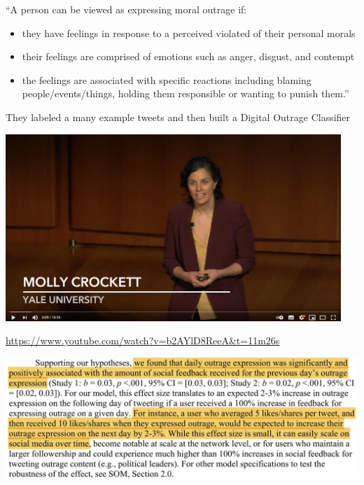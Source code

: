 \documentclass[aspectratio=169]{beamer}
\begin{document}
\begin{frame}

``A person can be viewed as expressing moral outrage if:
\begin{itemize}
\item they have feelings in response to a perceived violated of their personal morals 
\item their feelings are comprised of emotions such as anger, disgust, and contempt
\item the feelings are associated with specific reactions including blaming people/events/things, holding them responsible or wanting to punish them.''
\end{itemize}

\vfill
They labeled a many example tweets and then built a Digital Outrage Classifier

\end{frame}
\begin{frame} 

\begin{center}
\includegraphics[width=0.95\textwidth]{figures/crockett_talk}
\end{center}

\vfill

\url{https://www.youtube.com/watch?v=b2AYlD8ReeA&t=11m26s}

\end{frame}
\begin{frame} 

\begin{center}
\includegraphics[width=\textwidth]{figures/brady_how_2021_study1_2}
\end{center}

\end{frame}
\end{document}
